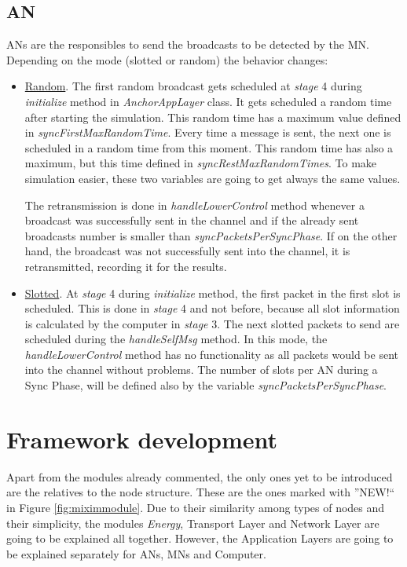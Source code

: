 \subsection{\ac{AN}}

\acp{AN} are the responsibles to send the broadcasts to be detected by the \ac{MN}. Depending on the mode (slotted or random) the 
behavior changes:
\begin{itemize}
 \item \underline{Random}. The first random broadcast gets scheduled at \textit{stage} 4 during \textit{initialize} method in \textit{AnchorAppLayer}
class. It gets scheduled a random time after starting the simulation. This random time has a maximum value defined in 
\textit{syncFirstMaxRandomTime}. Every time a message is sent, the next one is scheduled in a random time from this moment. This random 
time has also a maximum, but this time defined in \textit{syncRestMaxRandomTimes}. To make simulation easier, these two variables are going to get
always the same values.

The retransmission is done in \textit{handleLowerControl}
method whenever a broadcast was successfully sent in the channel and if the already sent broadcasts number is smaller than 
\textit{syncPacketsPerSyncPhase}. If on the other hand, the broadcast was not successfully sent into the channel, it is retransmitted, recording
it for the results.
 \item \underline{Slotted}. At \textit{stage} 4 during \textit{initialize} method, the first packet in the first slot is scheduled. This is done
in \textit{stage} 4 and not before, because all slot information is calculated by the computer in \textit{stage} 3. The next slotted packets to
send are scheduled during the \textit{handleSelfMsg} method. In this mode, the \textit{handleLowerControl} method has no functionality as all 
packets would be sent into the channel without problems. The number of slots per \ac{AN} during a Sync Phase, will be defined also by the variable 
\textit{syncPacketsPerSyncPhase}.
\end{itemize}


\section{Framework development}
\label{sec:frameworkdevelopment}

Apart from the modules already commented, the only ones yet to be introduced are the relatives to the node structure. These are the ones marked
with ''NEW$!$`` in Figure \ref{fig:miximmodule}. Due to their similarity among types of nodes and their simplicity, the modules 
\textit{Energy}, Transport Layer and Network Layer are going to be explained all together. However, the Application Layers are going to be 
explained separately for \acp{AN}, \acp{MN} and Computer.

